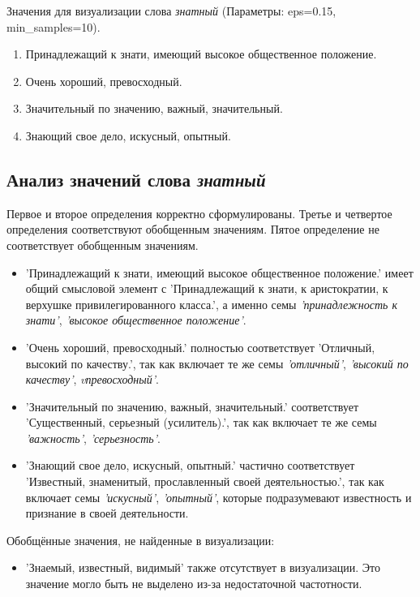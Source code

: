Значения для визуализации слова \textit{знатный} (Параметры: eps=0.15, min\_samples=10).

\begin{enumerate}
    \item Принадлежащий к знати, имеющий высокое общественное положение.
    \item Очень хороший, превосходный.
    \item Значительный по значению, важный, значительный.
    \item Знающий свое дело, искусный, опытный.
\end{enumerate}

\subsection*{Анализ значений слова \textit{знатный}}

Первое и второе определения корректно сформулированы.
Третье и четвертое определения соответствуют обобщенным значениям.
Пятое определение не соответствует обобщенным значениям.

\begin{itemize}
    \item ’Принадлежащий к знати, имеющий высокое общественное положение.’ имеет общий смысловой элемент с
’Принадлежащий к знати, к аристократии, к верхушке привилегированного класса.’,
а именно семы \textit{’принадлежность к знати’}, \textit{’высокое общественное положение’}.

    \item ’Очень хороший, превосходный.’ полностью соответствует ’Отличный, высокий по качеству.’,
так как включает те же семы \textit{’отличный’}, \textit{’высокий по качеству’}, \textit{vпревосходный’}.

    \item ’Значительный по значению, важный, значительный.’ соответствует
’Существенный, серьезный (усилитель).’, так как включает те же семы \textit{’важность’}, \textit{’серьезность’}.

    \item ’Знающий свое дело, искусный, опытный.’ частично соответствует
’Известный, знаменитый, прославленный своей деятельностью.’,
так как включает семы \textit{’искусный’}, \textit{’опытный’}, которые подразумевают известность и признание в своей деятельности.
\end{itemize}

Обобщённые значения, не найденные в визуализации:
\begin{itemize}
    \item ’Знаемый, известный, видимый’ также отсутствует в визуализации.
Это значение могло быть не выделено из-за недостаточной частотности.
\end{itemize}

